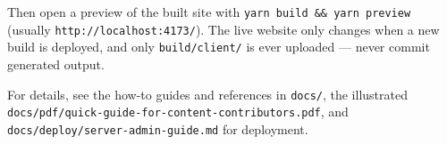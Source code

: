 \documentclass[11pt]{book}
\begin{document}
Then open a preview of the built site with \texttt{yarn build \&\& yarn preview} (usually \texttt{http://localhost:4173/}). The live website only changes when a new build is deployed, and only \texttt{build/client/} is ever uploaded --- never commit generated output.

For details, see the how-to guides and references in \texttt{docs/}, the illustrated \texttt{docs/pdf/quick-guide-for-content-contributors.pdf}, and \texttt{docs/deploy/server-admin-guide.md} for deployment.
\end{document}
